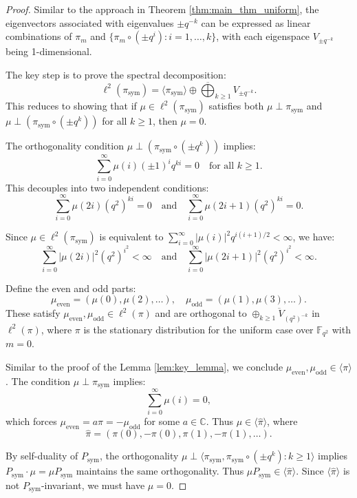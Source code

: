 \documentclass[a4]{amsart}
\newcommand{\sym}{\mathrm{sym}}
\theoremstyle{remark} \newtheorem{remark}[theorem]{Remark}
\begin{document}
\begin{proof}
Similar to the approach in Theorem \ref{thm:main_thm_uniform}, the eigenvectors associated with eigenvalues $\pm q^{-k}$ can be expressed as linear combinations of $\pi_m$ and $\{\pi_m\circ (\pm q^i) : i=1,\dots,k\}$, with each eigenspace $V_{\pm q^{-k}}$ being 1-dimensional.

The key step is to prove the spectral decomposition:
\[
\ell^2(\pi_\sym) = \overline{\langle\pi_\sym\rangle \oplus \bigoplus_{k\geq 1} V_{\pm q^{-k}}}.
\]
This reduces to showing that if $\mu\in \ell^2(\pi_\sym)$ satisfies both $\mu\perp \pi_\sym$ and $\mu\perp (\pi_\sym\circ (\pm q^k))$ for all $k\geq 1$, then $\mu=0$.

The orthogonality condition $\mu\perp (\pi_\sym\circ (\pm q^k))$ implies:
\[
\sum_{i=0}^\infty \mu(i)(\pm 1)^i q^{ki} = 0 \quad \text{for all } k\geq 1.
\]
This decouples into two independent conditions:
\[
\sum_{i=0}^\infty \mu(2i)(q^2)^{ki} = 0 \quad \text{and} \quad \sum_{i=0}^\infty \mu(2i+1)(q^2)^{ki} = 0.
\]

Since $\mu\in \ell^2(\pi_\sym)$ is equivalent to $\sum_{i=0}^\infty |\mu(i)|^2 q^{i(i+1)/2} < \infty$, we have:
\[
\sum_{i=0}^\infty |\mu(2i)|^2 (q^2)^{i^2} < \infty \quad \text{and} \quad \sum_{i=0}^\infty |\mu(2i+1)|^2 (q^2)^{i^2} < \infty.
\]

Define the even and odd parts:
\[
\mu_{\text{even}} = (\mu(0),\mu(2),\dots), \quad \mu_{\text{odd}} = (\mu(1),\mu(3),\dots).
\]
These satisfy $\mu_{\text{even}}, \mu_{\text{odd}} \in \ell^2(\pi)$ and are orthogonal to $\overline{\oplus_{k\geq 1}V_{(q^2)^{-k}}}$ in $\ell^2(\pi)$, where $\pi$ is the stationary distribution for the uniform case over $\mathbb{F}_{q^2}$ with $m=0$.

Similar to the proof of the Lemma \ref{lem:key_lemma}, we conclude $\mu_{\text{even}}, \mu_{\text{odd}} \in \langle \pi \rangle$. The condition $\mu\perp \pi_\sym$ implies:
\[
\sum_{i=0}^\infty \mu(i) = 0,
\]
which forces $\mu_{\text{even}} = a\pi = -\mu_{\text{odd}}$ for some $a\in \mathbb{C}$. Thus $\mu\in \langle \hat{\pi} \rangle$, where
\[
\hat{\pi} = (\pi(0),-\pi(0),\pi(1),-\pi(1),\dots).
\]

By self-duality of $P_\sym$, the orthogonality $\mu \perp \langle \pi_\sym, \pi_\sym \circ (\pm q^k): k\geq 1 \rangle$ implies $P_\sym\cdot \mu =\mu P_\sym$ maintains the same orthogonality. Thus $\mu P_\sym \in \langle \hat{\pi} \rangle$. Since $\langle \hat{\pi} \rangle$ is not $P_\sym$-invariant, we must have $\mu = 0$.
\end{proof}
\end{document}

